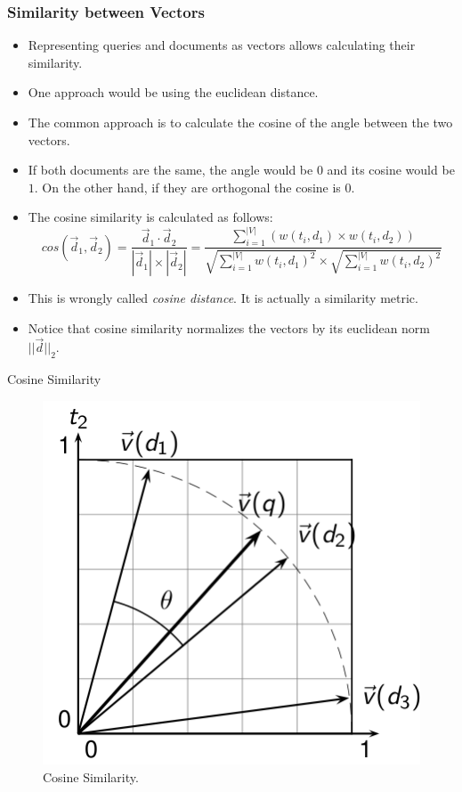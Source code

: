 \documentclass[handout]{beamer}
\begin{document}
\begin{frame}\frametitle{Similarity between Vectors}
\footnotesize{
\begin{itemize}
 \item Representing queries and documents as vectors allows calculating their similarity.
 \item One approach would be using the euclidean distance.
 
 \item The common approach is to calculate the cosine of the angle between the two vectors.
 \item If both documents are the same, the angle would be $0$ and its cosine would be $1$. On the other hand, if they are orthogonal  the cosine is $0$.
 \item The cosine similarity is calculated as follows:
 \begin{displaymath}
 cos(\vec{d}_{1},\vec{d}_{2})= \frac{\vec{d}_{1}\cdot \vec{d}_{2}}{|\vec{d}_{1}|\times|\vec{d}_{2}|} = \frac{\sum_{i=1}^{|V|}(w(t_{i},d_{1})\times w(t_{i},d_{2}))}{\sqrt{\sum_{i=1}^{|V|} w(t_{i},d_{1})^2}\times \sqrt{\sum_{i=1}^{|V|} w(t_{i},d_{2})^2}}
\end{displaymath}
\item This is wrongly called \emph{cosine distance}. It is actually a similarity metric.
\item Notice that cosine similarity normalizes the vectors by its euclidean norm $||\vec{d}||_{2}$.

\end{itemize}


}
\end{frame}

\begin{frame}{Cosine Similarity}

\begin{figure}[h!]
	\centering
	\includegraphics[scale=0.5]{pics/cos.png}
	\caption{ Cosine Similarity.}
\end{figure}

\end{frame}
\end{document}

